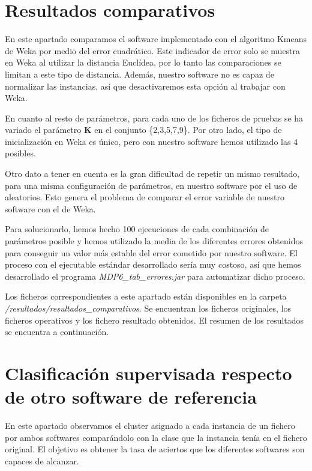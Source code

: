 \documentclass[a4paper]{report}
\begin{document}
	\section{Resultados comparativos}
	\label{rescomparativos}
	En este apartado comparamos el software implementado con el algoritmo Kmeans de Weka por medio del error cuadrático. Este indicador de error solo se muestra en Weka al utilizar la distancia Euclídea, por lo tanto las comparaciones se limitan a este tipo de distancia. Además, nuestro software no es capaz de normalizar las instancias, así que desactivaremos esta opción al trabajar con Weka.
	
	En cuanto al resto de parámetros, para cada uno de los ficheros de pruebas se ha variado el parámetro \textbf{K} en el conjunto \{2,3,5,7,9\}. Por otro lado, el tipo de inicialización en Weka es único, pero con nuestro software hemos utilizado las 4 posibles.
	
	Otro dato a tener en cuenta es la gran dificultad de repetir un mismo resultado, para una misma configuración de parámetros, en nuestro software por el uso de aleatorios. Esto genera el problema de comparar el error variable de nuestro software con el de Weka.
	
	Para solucionarlo, hemos hecho 100 ejecuciones de cada combinación de parámetros posible y hemos utilizado la media de los diferentes errores obtenidos para conseguir un valor más estable del error cometido por nuestro software. El proceso con el ejecutable estándar desarrollado sería muy costoso, así que hemos desarrollado el programa \textit{MDP6\_tab\_errores.jar} para automatizar dicho proceso.
	
	Los ficheros correspondientes a este apartado están disponibles en la carpeta \textit{/resultados/resultados\_comparativos}. Se encuentran los ficheros originales, los ficheros operativos y los fichero resultado obtenidos. El resumen de los resultados se encuentra a continuación.
	
	\FloatBarrier
	\section{Clasificación supervisada respecto de otro software de referencia}
	\label{resprecision}
	En este apartado observamos el cluster asignado a cada instancia de un fichero por ambos softwares comparándolo con la clase que la instancia tenía en el fichero original. El objetivo es obtener la tasa de aciertos que los diferentes softwares son capaces de alcanzar.
	
\end{document}
